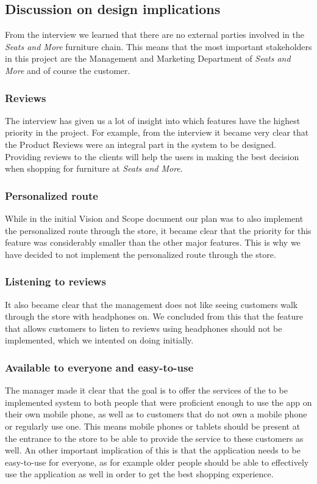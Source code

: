 \documentclass[a4paper]{article}
\begin{document}
\subsection{Discussion on design implications}
From the interview we learned that there are no external parties involved in the \textit{Seats and More} furniture chain. This means that the most important stakeholders in this project are the Management and Marketing Department of \textit{Seats and More} and of course the customer.

\subsubsection*{Reviews}
The interview has given us a lot of insight into which features have the highest priority in the project. For example, from the interview it became very clear that the Product Reviews were an integral part in the system to be designed. Providing reviews to the clients will help the users in making the best decision when shopping for furniture at \textit{Seats and More}.

\subsubsection*{Personalized route}
While in the initial Vision and Scope document our plan was to also implement the personalized route through the store, it  became clear that the priority for this feature was considerably smaller than the other major features. This is why we have decided to not implement the personalized route through the store. 

\subsubsection*{Listening to reviews}
It also became clear that the management does not like seeing customers walk through the store with headphones on. We concluded from this that the feature that allows customers to listen to reviews using headphones should not be implemented, which we intented on doing initially. 

\subsubsection*{Available to everyone and easy-to-use}
The manager made it clear that the goal is to offer the services of the to be implemented system to both people that were proficient enough to use the app on their own mobile phone, as well as to customers that do not own a mobile phone or regularly use one. This means mobile phones or tablets should be present at the entrance to the store to be able to provide the service to these customers as well. An other important implication of this is that the application needs to be easy-to-use for everyone, as for example older people should be able to effectively use the application as well in order to get the best shopping experience.
\end{document}
